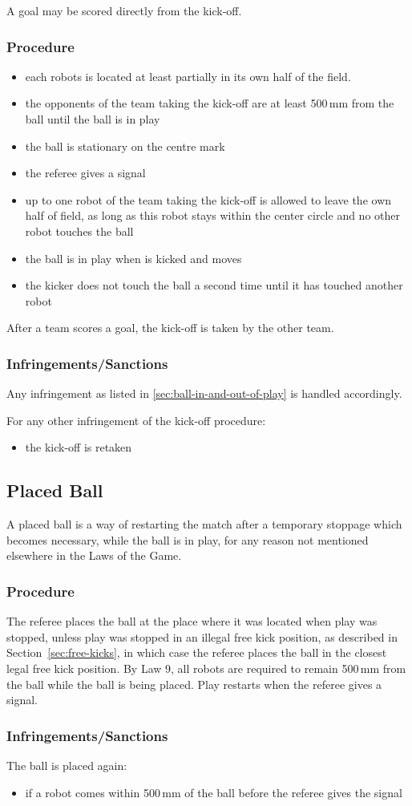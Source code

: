 A goal may be scored directly from the kick-off.

\subsubsection{Procedure}
\begin{itemize}
\item each robots is located at least partially in its own half of the field.
\item the opponents of the team taking the kick-off are at least 500\,mm from the ball until the ball is in play
\item the ball is stationary on the centre mark
\item the referee gives a signal
\item up to one robot of the team taking the kick-off is allowed to leave the own half of field,
as long as this robot stays within the center circle and no other robot touches the ball
\item the ball is in play when is kicked and moves
\item the kicker does not touch the ball a second time until it has touched another robot
\end{itemize}

After a team scores a goal, the kick-off is taken by the other team.

\subsubsection{Infringements/Sanctions}
Any infringement as listed in \autoref{sec:ball-in-and-out-of-play} is handled accordingly.

For any other infringement of the kick-off procedure:
\begin{itemize}
\item the kick-off is retaken
\end{itemize}

\subsection{Placed Ball}
\label{sec:placedBall}
A placed ball is a way of restarting the match after a temporary stoppage which becomes necessary, while the ball is in play, for any reason not mentioned elsewhere in the Laws of the Game.

\subsubsection{Procedure}
The referee places the ball at the place where it was located when play was stopped, unless
play was stopped in an illegal free kick position, as described in Section~\ref{sec:free-kicks},
in which case the referee places the ball in the closest legal free kick position.
By Law 9, all robots are required to remain 500\,mm from the ball while the ball is being placed.
Play restarts when the referee gives a signal.

\subsubsection{Infringements/Sanctions}
The ball is placed again:
\begin{itemize}
\item if a robot comes within 500\,mm of the ball before the referee gives the signal
\end{itemize}
